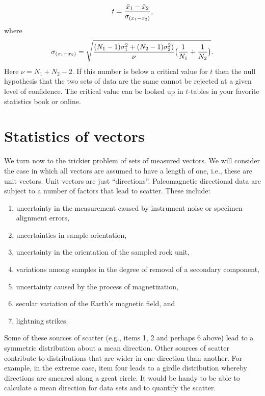 $$
{t} = { {\bar x_1 - \bar x_2} \over {\sigma_{(x_1-x_2)} }},
$$
\noindent where
$$
 {\sigma_{(x_1-x_2)} } = \sqrt{ 
{ {(N_1-1)\sigma_1^2 + (N_2 -1)\sigma_2^2)}\over {\nu} }
{\bigl({ {1\over{N_1} }+ { {1\over{N_2} }\bigr) }}}
}.
$$
\noindent  Here $\nu= N_1+N_2 -2$.     If this number is below a critical value for $t$ then the null hypothesis that the two sets of data are the same cannot be rejected at a given level of confidence.  The critical value can be looked up in $t$-tables in your favorite statistics book or online.   


\section{Statistics of vectors}

We turn now to the trickier problem of sets of measured vectors. We will consider the case in which all 
vectors are assumed to have a length of one, i.e., these are  unit vectors.  Unit vectors are just ``directions''.    Paleomagnetic
directional data are subject to a number of factors that lead to scatter.  These
include: 

\begin{enumerate}
\item uncertainty in the measurement caused by  instrument noise or
specimen alignment errors,
\item uncertainties in sample orientation,
\item uncertainty in the orientation of the sampled rock unit,
\item variations among samples in the degree of removal of a secondary
component,
\item uncertainty caused by  the process of magnetization, 
\item secular variation of the Earth's magnetic field, and
\item lightning strikes.
\end{enumerate}

Some of these sources of scatter (e.g., items  1, 2 and perhaps 6 above) lead to a symmetric distribution about a mean direction.    Other sources  of scatter contribute to
distributions that are wider in one direction than another. For example, in the extreme case, item four
leads to a girdle distribution whereby directions are smeared along a great circle.
 It would be handy to be able to calculate a
mean direction for data sets and to quantify the scatter.  



